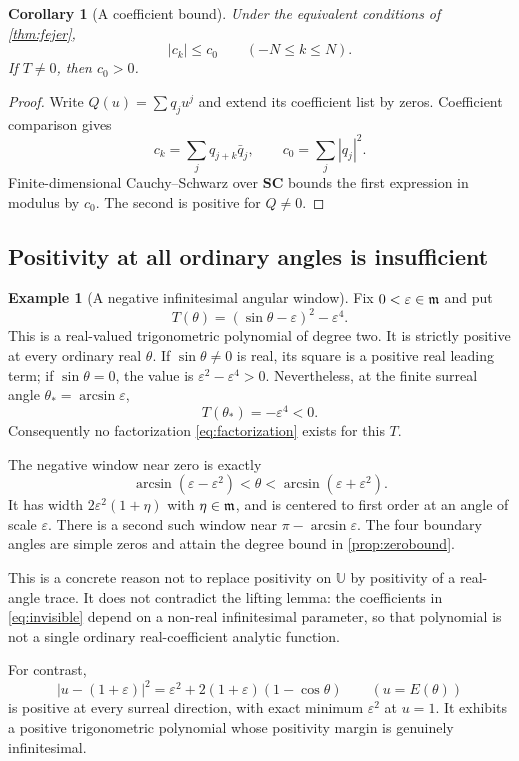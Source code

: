 \documentclass[11pt,letterpaper]{article}
\newtheorem{corollary}[theorem]{Corollary}
\theoremstyle{definition}
\newtheorem{example}[theorem]{Example}
\theoremstyle{remark}
\newcommand{\SC}{\mathbf{SC}}
\newcommand{\U}{\mathbb U}\newcommand{\PP}{\mathbb P}
\newcommand{\arcs}{\operatorname{arcsin}}
\numberwithin{equation}{section}
\begin{document}
\begin{corollary}[A coefficient bound]
Under the equivalent conditions of \cref{thm:fejer},
\[
 |c_k|\le c_0\qquad(-N\le k\le N).
\]
If $T\ne0$, then $c_0>0$.
\end{corollary}
\begin{proof}
Write $Q(u)=\sum q_ju^j$ and extend its coefficient list by zeros. Coefficient comparison gives
\[
 c_k=\sum_jq_{j+k}\bar q_j,\qquad c_0=\sum_j|q_j|^2.
\]
Finite-dimensional Cauchy--Schwarz over $\SC$ bounds the first expression in modulus by $c_0$. The second is positive for $Q\ne0$.
\end{proof}

\subsection{Positivity at all ordinary angles is insufficient}
\begin{example}[A negative infinitesimal angular window]\label{ex:invisible}
Fix $0<\varepsilon\in\mathfrak m$ and put
\begin{equation}\label{eq:invisible}
 T(\theta)=(\sin\theta-\varepsilon)^2-\varepsilon^4.
\end{equation}
This is a real-valued trigonometric polynomial of degree two. It is strictly positive at every ordinary real $\theta$. If $\sin\theta\ne0$ is real, its square is a positive real leading term; if $\sin\theta=0$, the value is $\varepsilon^2-\varepsilon^4>0$. Nevertheless, at the finite surreal angle $\theta_*=\arcs\varepsilon$,
\[
 T(\theta_*)=-\varepsilon^4<0.
\]
Consequently no factorization \eqref{eq:factorization} exists for this $T$.

The negative window near zero is exactly
\[
 \arcs(\varepsilon-\varepsilon^2)
 <\theta<\arcs(\varepsilon+\varepsilon^2).
\]
It has width $2\varepsilon^2(1+\eta)$ with $\eta\in\mathfrak m$, and is centered to first order at an angle of scale $\varepsilon$. There is a second such window near $\pi-\arcs\varepsilon$. The four boundary angles are simple zeros and attain the degree bound in \cref{prop:zerobound}.
\end{example}
This is a concrete reason not to replace positivity on $\U$ by positivity of a real-angle trace. It does not contradict the lifting lemma: the coefficients in \eqref{eq:invisible} depend on a non-real infinitesimal parameter, so that polynomial is not a single ordinary real-coefficient analytic function.

For contrast,
\[
 |u-(1+\varepsilon)|^2
 =\varepsilon^2+2(1+\varepsilon)(1-\cos\theta)
 \qquad(u=E(\theta))
\]
is positive at every surreal direction, with exact minimum $\varepsilon^2$ at $u=1$. It exhibits a positive trigonometric polynomial whose positivity margin is genuinely infinitesimal.
\end{document}
